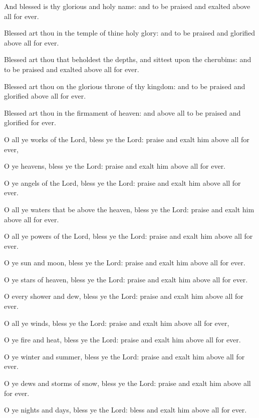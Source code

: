 {\par }{\PP {}And blessed is thy glorious and holy name: and to be praised and exalted above all for ever.
\par }{\PP {}Blessed art thou in the temple of thine holy glory: and to be praised and glorified above all for ever.
\par }{\PP {}Blessed art thou that beholdest the depths, and sittest upon the cherubims: and to be praised and exalted above all for ever.
\par }{\PP {}Blessed art thou on the glorious throne of thy kingdom: and to be praised and glorified above all for ever.
\par }{\PP {}Blessed art thou in the firmament of heaven: and above all to be praised and glorified for ever.
\par }{\PP {}O all ye works of the Lord, bless ye the Lord: praise and exalt him above all for ever,
\par }{\PP {}O ye heavens, bless ye the Lord: praise and exalt him above all for ever.
\par }{\PP {}O ye angels of the Lord, bless ye the Lord: praise and exalt him above all for ever.
\par }{\PP {}O all ye waters that be above the heaven, bless ye the Lord: praise and exalt him above all for ever.
\par }{\PP {}O all ye powers of the Lord, bless ye the Lord: praise and exalt him above all for ever.
\par }{\PP {}O ye sun and moon, bless ye the Lord: praise and exalt him above all for ever.
\par }{\PP {}O ye stars of heaven, bless ye the Lord: praise and exalt him above all for ever.
\par }{\PP {}O every shower and dew, bless ye the Lord: praise and exalt him above all for ever.
\par }{\PP {}O all ye winds, bless ye the Lord: praise and exalt him above all for ever,
\par }{\PP {}O ye fire and heat, bless ye the Lord: praise and exalt him above all for ever.
\par }{\PP {}O ye winter and summer, bless ye the Lord: praise and exalt him above all for ever.
\par }{\PP {}O ye dews and storms of snow, bless ye the Lord: praise and exalt him above all for ever.
\par }{\PP {}O ye nights and days, bless ye the Lord: bless and exalt him above all for ever.
}
